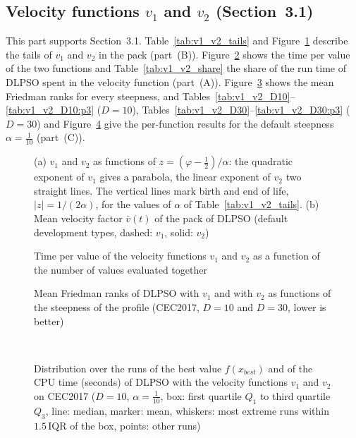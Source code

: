 \FloatBarrier
\subsection{Velocity functions $v_1$ and $v_2$ (Section~3.1)}\label{app:v1v2}
This part supports Section~3.1. Table~\ref{tab:v1_v2_tails} and Figure~\ref{fig:v1_v2_tails} describe the tails of $v_1$ and $v_2$ in the pack (part~(B)). Figure~\ref{fig:v1_v2_cost} shows the time per value of the two functions and Table~\ref{tab:v1_v2_share} the share of the run time of DLPSO spent in the velocity function (part~(A)). Figure~\ref{fig:v1_v2_alpha} shows the mean Friedman ranks for every steepness, and Tables~\ref{tab:v1_v2_D10}--\ref{tab:v1_v2_D10:p3} ($D=10$), Tables~\ref{tab:v1_v2_D30}--\ref{tab:v1_v2_D30:p3} ($D=30$) and Figure~\ref{sosanhham} give the per-function results for the default steepness $\alpha=\frac1{10}$ (part~(C)).




\begin{figure}[!htbp]
    \centering
    \caption{(a) $v_1$ and $v_2$ as functions of $z=(\varphi-\frac12)/\alpha$: the quadratic exponent of $v_1$ gives a parabola, the linear exponent of $v_2$ two straight lines. The vertical lines mark birth and end of life, $|z|=1/(2\alpha)$, for the values of $\alpha$ of Table~\ref{tab:v1_v2_tails}. (b) Mean velocity factor $\bar v(t)$ of the pack of DLPSO (default development types, dashed: $v_1$, solid: $v_2$)}
    \label{fig:v1_v2_tails}
\end{figure}


\begin{figure}[!htbp]
    \centering
    \caption{Time per value of the velocity functions $v_1$ and $v_2$ as a function of the number of values evaluated together}
    \label{fig:v1_v2_cost}
\end{figure}

\begin{figure}[!htbp]
    \centering
    \caption{Mean Friedman ranks of DLPSO with $v_1$ and with $v_2$ as functions of the steepness of the profile (CEC2017, $D=10$ and $D=30$, lower is better)}
    \label{fig:v1_v2_alpha}
\end{figure}


\begin{figure}[!htbp]
   \centering
    \\
\caption{Distribution over the runs of the best value $f(x_{best})$ and of the CPU time (seconds) of DLPSO with the velocity functions $v_1$ and $v_2$ on CEC2017 ($D=10$, $\alpha=\frac1{10}$, box: first quartile $Q_1$ to third quartile $Q_3$, line: median, marker: mean, whiskers: most extreme runs within $1.5\,\mathrm{IQR}$ of the box, points: other runs)}
    \label{sosanhham}
\end{figure}


